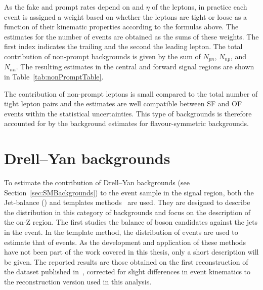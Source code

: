 As the fake and prompt rates depend on \pt and $\eta$ of the leptons, in practice each event is assigned a weight based on whether the leptons are tight or loose as a function of their kinematic properties according to the formulas above. The estimates for the number of events are obtained as the sums of these weights. The first index indicates the trailing and the second the leading lepton. The total contribution of non-prompt backgrounds is given by the sum of $N_{pn}$, $N_{np}$, and $N_{nn}$. The resulting estimates in the central and forward signal regions are shown in Table~\ref{tab:nonPromptTable}. 

The contribution of non-prompt leptons is small compared to the total number of tight lepton pairs and the estimates are well compatible between SF and OF events within the statistical uncertainties. This type of backgrounds is therefore accounted for by the background estimates for flavour-symmetric backgrounds.

\section{Drell--Yan backgrounds}
To estimate the contribution of Drell--Yan backgrounds (see Section~\ref{sec:SMBackgrounds}) to the event sample in the signal region, both the Jet-\Z balance (\JZB) and \MET templates methods~\cite{Chatrchyan:2012qka} are used. They are designed to describe the \MET distribution in this category of backgrounds and focus on the description of the on-Z region. The first studies the balance of \Z boson candidates against the jets in the event. In the \MET template method, the \MET distribution of \gjets events are used to estimate that of \zjets events. As the development and application of these methods have not been part of the work covered in this thesis, only a short description will be given. The reported results are those obtained on the first reconstruction of the dataset published in~\cite{Khachatryan:2015lwa}, corrected for slight differences in event kinematics to the reconstruction version used in this analysis. 
